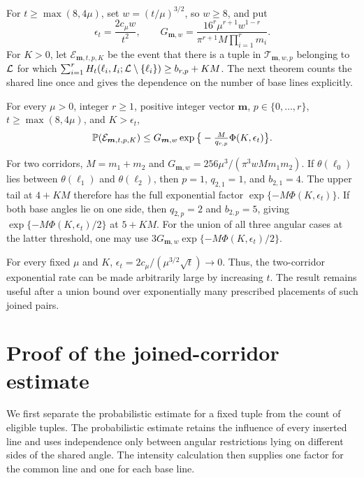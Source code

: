 \documentclass[11pt,letterpaper]{article}
\begin{document}
For $t\ge\max(8,4\mu)$, set $w=(t/\mu)^{3/2}$, so $w\ge8$, and put
\[
 \epsilon_t=\frac{2c_\mu w}{t^2},\qquad
 G_{\boldsymbol m,w}
 =\frac{16^r\mu^{r+1}w^{1-r}}{\pi^{r+1}M\prod_{i=1}^r m_i}.
\]
For $K>0$, let $\mathcal E_{\boldsymbol m,t,p,K}$ be the event that there is a tuple in $\mathcal T_{\boldsymbol m,w,p}$ belonging to $\cL$ for which
$\sum_{i=1}^rH_t(\ell_i,I_i;\cL\setminus\{\ell_i\})\ge b_{r,p}+KM$.
The next theorem counts the shared line once and gives the dependence on the number of base lines explicitly.

\begin{theorem}\label{thm:joined}
For every $\mu>0$, integer $r\ge1$, positive integer vector $\boldsymbol m$, $p\in\{0,\ldots,r\}$, $t\ge\max(8,4\mu)$, and $K>\epsilon_t$,
\begin{equation}\label{eq:main}
 \P(\mathcal E_{\boldsymbol m,t,p,K})
 \le G_{\boldsymbol m,w}
       \exp\big\{-\tfrac{M}{q_{r,p}}\Phi(K,\epsilon_t)\big\}.
\end{equation}
\end{theorem}

For two corridors, $M=m_1+m_2$ and $G_{\boldsymbol m,w}=256\mu^3/(\pi^3wMm_1m_2)$. If $\theta(\ell_0)$ lies between $\theta(\ell_1)$ and $\theta(\ell_2)$, then $p=1$, $q_{2,1}=1$, and $b_{2,1}=4$. The upper tail at $4+KM$ therefore has the full exponential factor $\exp\{-M\Phi(K,\epsilon_t)\}$. If both base angles lie on one side, then $q_{2,p}=2$ and $b_{2,p}=5$, giving $\exp\{-M\Phi(K,\epsilon_t)/2\}$ at $5+KM$. For the union of all three angular cases at the latter threshold, one may use $3G_{\boldsymbol m,w}\exp\{-M\Phi(K,\epsilon_t)/2\}$.

For every fixed $\mu$ and $K$, $\epsilon_t=2c_\mu/(\mu^{3/2}\sqrt t)\to0$. Thus, the two-corridor exponential rate can be made arbitrarily large by increasing $t$. The result remains useful after a union bound over exponentially many prescribed placements of such joined pairs.

\section{Proof of the joined-corridor estimate}

We first separate the probabilistic estimate for a fixed tuple from the count of eligible tuples. The probabilistic estimate retains the influence of every inserted line and uses independence only between angular restrictions lying on different sides of the shared angle. The intensity calculation then supplies one factor for the common line and one for each base line.
\end{document}
